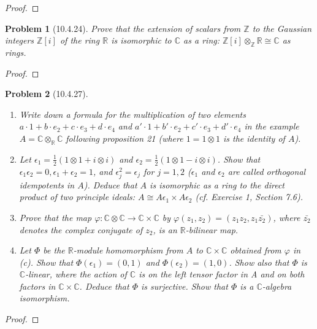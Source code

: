 \documentclass[10pt]{article}
\newcommand{\sk}{\vskip 10mm}
\newcommand{\bb}[1]{\mathbb{#1}}
\theoremstyle{plain}
\newtheorem{problem}{Problem}
\theoremstyle{remark}
\begin{document}
\begin{proof}
  
\end{proof}

\sk

\begin{problem}[10.4.24]
  Prove that the extension of scalars from $\bb{Z}$ to the Gaussian integers
  $\bb{Z}[i]$ of the ring $\bb{R}$ is isomorphic to $\bb{C}$ as a ring:
  $\bb{Z}[i]\otimes_{\bb{Z}}\bb{R}\cong\bb{C}$ as rings.
\end{problem}

\begin{proof}
  
\end{proof}

\sk

\begin{problem}[10.4.27]
  \begin{enumerate}
  \item[(a)] Write down a formula for the multiplication of two elements
    $a\cdot 1+b\cdot e_2+c\cdot e_3+d\cdot e_4$ and
    $a'\cdot 1+b'\cdot e_2+c'\cdot e_3+d'\cdot e_4$ in the example
    $A=\bb{C}\otimes_{\bb{R}}\bb{C}$ following proposition 21
    (where $1=1\otimes 1$ is the identity of $A$).
  \item[(b)] Let $\epsilon_1=\frac{1}{2}(1\otimes 1+i\otimes i)$ and
    $\epsilon_2=\frac{1}{2}(1\otimes 1-i\otimes i)$. Show that
    $\epsilon_1\epsilon_2=0,\epsilon_1+\epsilon_2=1$, and
    $\epsilon_j^2=\epsilon_j$ for $j=1,2$ ($\epsilon_1$ and $\epsilon_2$ are
    called orthogonal idempotents in $A$). Deduce that $A$ is isomorphic
    as a ring to the direct product of two principle ideals:
    $A\cong A\epsilon_1\times A\epsilon_2$ (cf. Exercise 1, Section 7.6).
  \item[(c)] Prove that the map
    $\varphi:\bb{C}\otimes\bb{C}\rightarrow\bb{C}\times\bb{C}$ by
    $\varphi(z_1,z_2)=(z_1z_2,z_1\bar{z_2})$, where $\bar{z_2}$
    denotes the complex conjugate of $z_2$, is an $\bb{R}$-bilinear map.
  \item[(d)] Let $\Phi$ be the $\bb{R}$-module homomorphism from $A$ to
    $\bb{C}\times\bb{C}$ obtained from $\varphi$ in (c). Show that
    $\Phi(\epsilon_1)=(0,1)$ and $\Phi(\epsilon_2)=(1,0)$. Show also that $\Phi$
    is $\bb{C}$-linear, where the action of $\bb{C}$ is on the left tensor
    factor in A and on both factors in $\bb{C}\times\bb{C}$. Deduce that
    $\Phi$ is surjective. Show that $\Phi$ is a $\bb{C}$-algebra isomorphism.
  \end{enumerate}
\end{problem}

\begin{proof}
  
\end{proof}

\end{document}
